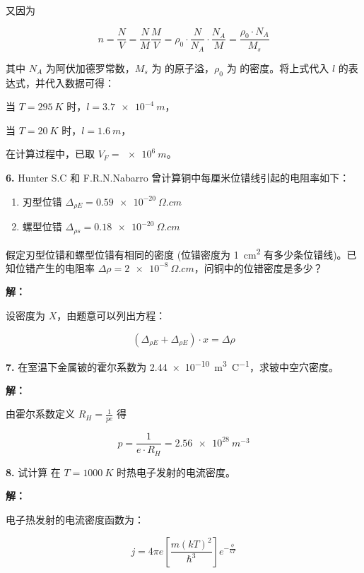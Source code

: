 又因为

\begin{equation*}
    n = \frac{N}{V} = \frac{N}{M} \frac{M}{V} = \rho_0 \cdot \frac{N}{N_A} \cdot \frac{N_A}{M} = \frac{\rho_0 \cdot N_A}{M_s}
\end{equation*}

其中 $N_A$ 为阿伏加德罗常数，$M_s$ 为  的原子溢，$\rho_0$ 为  的密度。将上式代入 $l$ 的表达式，并代入数据可得：

当 $T=\qty{295}{K}$ 时，$l=\qty{3.7e-4}{m}$，

当 $T=\qty{20}{K}$ 时，$l=\qty{1.6}{m}$，

在计算过程中，已取 $V_F=\qty{e6}{m}$。

\noindent \textbf{6.\quad} Hunter S.C 和 F.R.N.Nabarro 曾计算铜中每厘米位错线引起的电阻率如下：

\begin{enumerate}
    \item 刃型位错 $\Delta_{\rho E} = \qty{0.59e-20}{\Omega.cm}$
    \item 螺型位错 $\Delta_{\rho s} = \qty{0.18e-20}{\Omega.cm}$
\end{enumerate}

假定刃型位错和螺型位错有相同的密度 (位错密度为 \qty{1}{cm^2} 有多少条位错线)。已知位错产生的电阻率 $\Delta \rho = \qty{2e-8}{\Omega.cm}$，问铜中的位错密度是多少？

\noindent \textbf{解：}

设密度为 $X$，由题意可以列出方程：

\begin{equation*}
    \left(\Delta_{\rho E} + \Delta_{\rho E}\right) \cdot x = \Delta \rho
\end{equation*}

\noindent \textbf{7.\quad} 在室温下金属铍的霍尔系数为 \qty{2.44e-10}{m^3.C^{-1}}，求铍中空穴密度。

\noindent \textbf{解：}

由霍尔系数定义 $R_H=\frac{1}{pe}$ 得

\begin{equation*}
    p = \frac{1}{e \cdot R_H} = \qty{2.56e28}{m^{-3}}
\end{equation*}

\noindent \textbf{8.\quad} 试计算  在 $T=\qty{1000}{K}$ 时热电子发射的电流密度。

\noindent \textbf{解：}

电子热发射的电流密度函数为：

\begin{equation*}
    j = 4\pi e \left[\frac{m(kT)^2}{\hbar^3}\right] e^{-\frac{\phi}{kT}}
\end{equation*}


